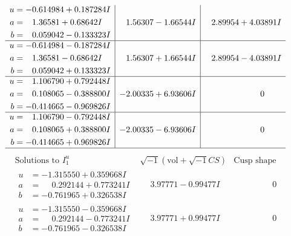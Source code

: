 \documentclass[1p]{elsarticle_modified}
\theoremstyle{definition}
\newcommand{\I}{\sqrt{-1}}
\begin{document}
$$\begin{array}{c|c|c}
\begin{aligned}
u &= -0.614984 + 0.187284 I \\
a &= \phantom{-}1.36581 + 0.68642 I \\
b &= \phantom{-}0.059042 - 0.133323 I\end{aligned}
 & \phantom{-}1.56307 - 1.66544 I & \phantom{-}2.89954 + 4.03891 I \\ \hline\begin{aligned}
u &= -0.614984 - 0.187284 I \\
a &= \phantom{-}1.36581 - 0.68642 I \\
b &= \phantom{-}0.059042 + 0.133323 I\end{aligned}
 & \phantom{-}1.56307 + 1.66544 I & \phantom{-}2.89954 - 4.03891 I \\ \hline\begin{aligned}
u &= \phantom{-}1.106790 + 0.792448 I \\
a &= \phantom{-}0.108065 - 0.388800 I \\
b &= -0.414665 - 0.969826 I\end{aligned}
 & -2.00335 + 6.93606 I & \phantom{-0.000000 } 0 \\ \hline\begin{aligned}
u &= \phantom{-}1.106790 - 0.792448 I \\
a &= \phantom{-}0.108065 + 0.388800 I \\
b &= -0.414665 + 0.969826 I\end{aligned}
 & -2.00335 - 6.93606 I & \phantom{-0.000000 } 0\\
 \hline 
 \end{array}$$\newpage$$\begin{array}{c|c|c}  
\text{Solutions to }I^u_{1}& \I (\text{vol} + \sqrt{-1}CS) & \text{Cusp shape}\\
 \hline 
\begin{aligned}
u &= -1.315550 + 0.359668 I \\
a &= \phantom{-}0.292144 + 0.773241 I \\
b &= -0.761965 + 0.326538 I\end{aligned}
 & \phantom{-}3.97771 - 0.99477 I & \phantom{-0.000000 } 0 \\ \hline\begin{aligned}
u &= -1.315550 - 0.359668 I \\
a &= \phantom{-}0.292144 - 0.773241 I \\
b &= -0.761965 - 0.326538 I\end{aligned}
 & \phantom{-}3.97771 + 0.99477 I & \phantom{-0.000000 } 0 \\ \hline\begin{aligned}

\end{aligned}
\end{array}$$
\end{document}

